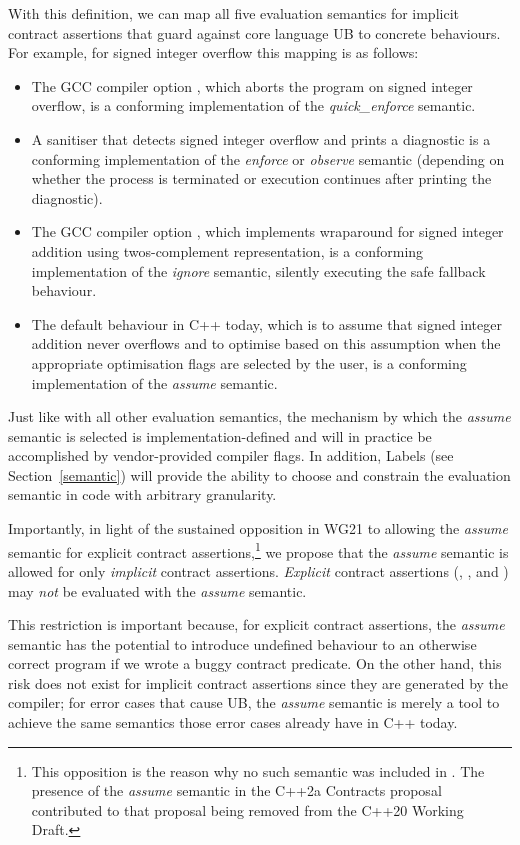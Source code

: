 With this definition, we can map all five evaluation semantics for implicit contract assertions that guard against core language UB to concrete behaviours. For example, for signed integer overflow this mapping is as follows:
\begin{itemize}
\item The GCC compiler option , which aborts the program on signed integer overflow, is a conforming implementation of the \emph{quick_enforce} semantic.
\item A sanitiser that detects signed integer overflow and prints a diagnostic is a conforming
implementation of the \emph{enforce} or \emph{observe} semantic (depending on whether the
process is terminated or execution continues after printing the diagnostic).
\item The GCC compiler option , which implements wraparound for signed integer addition using twos-complement representation, is a conforming implementation of the \emph{ignore} semantic,  silently executing the safe fallback behaviour.
\item The default behaviour in C++ today, which is to assume that signed integer addition never overflows and to optimise based on this assumption when the appropriate optimisation flags are selected by the user, is a conforming implementation of the \emph{assume} semantic.
\end{itemize}
Just like with all other evaluation semantics, the mechanism by which the \emph{assume} semantic is selected is implementation-defined and will in practice be accomplished by vendor-provided compiler flags. In addition, Labels (see Section~\ref{semantic}) will provide the ability to choose and constrain the evaluation semantic in code with arbitrary granularity.

Importantly, in light of the sustained opposition in WG21 to allowing the \emph{assume} semantic for explicit contract assertions,\footnote{This opposition is the reason why  no such semantic was included in \cite{P2900R14}. The presence of the \emph{assume} semantic in the C++2a Contracts proposal \cite{P0542R5} contributed to that proposal being removed from the C++20 Working Draft.} we propose that the \emph{assume} semantic is allowed for only \emph{implicit} contract assertions. \emph{Explicit} contract assertions (, , and ) may \emph{not} be evaluated with the \emph{assume} semantic.

This restriction is important because, for explicit contract assertions, the \emph{assume} semantic  has the potential to introduce undefined behaviour to an otherwise correct program if we wrote a buggy contract predicate. On the other hand, this risk does not exist for implicit contract assertions since they are generated by the compiler; for error cases that cause UB, the \emph{assume} semantic is merely a tool to achieve the same semantics those error cases already have in C++ today.

